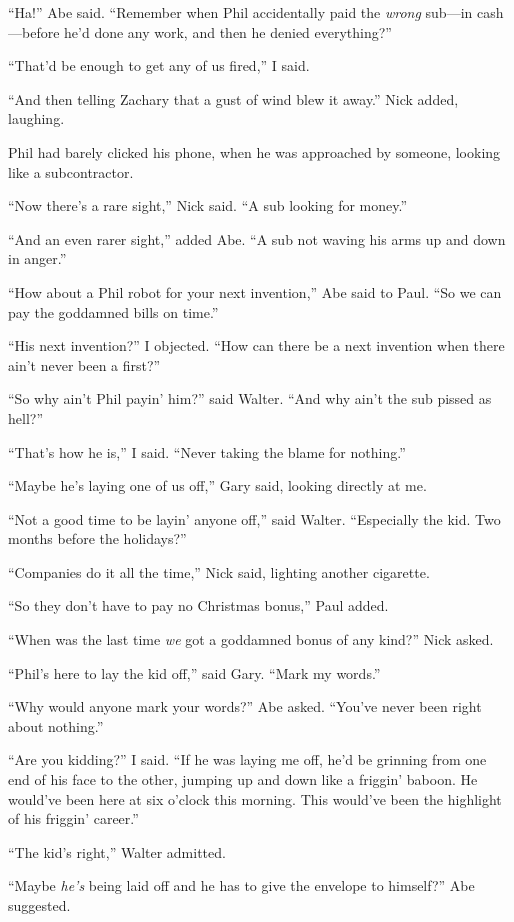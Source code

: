 ``Ha!'' Abe said. ``Remember when Phil accidentally paid the
\emph{wrong} sub---in cash---before he'd done any work, and then he
denied everything?''

``That'd be enough to get any of us fired,'' I said.

``And then telling Zachary that a gust of wind blew it away.'' Nick
added, laughing.

Phil had barely clicked his phone, when he was approached by someone,
looking like a subcontractor.

``Now there's a rare sight,'' Nick said. ``A sub looking for money.''

``And an even rarer sight,'' added Abe. ``A sub not waving his arms up
and down in anger.''

``How about a Phil robot for your next invention,'' Abe said to Paul.
``So we can pay the goddamned bills on time.''

``His next invention?'' I objected. ``How can there be a next invention
when there ain't never been a first?''

``So why ain't Phil payin' him?'' said Walter. ``And why ain't the sub
pissed as hell?''

``That's how he is,'' I said. ``Never taking the blame for nothing.''

``Maybe he's laying one of us off,'' Gary said, looking directly at me.

``Not a good time to be layin' anyone off,'' said Walter. ``Especially
the kid. Two months before the holidays?''

``Companies do it all the time,'' Nick said, lighting another cigarette.

``So they don't have to pay no Christmas bonus,'' Paul added.

``When was the last time \emph{we} got a goddamned bonus of any kind?''
Nick asked.

``Phil's here to lay the kid off,'' said Gary. ``Mark my words.''

``Why would anyone mark your words?'' Abe asked. ``You've never been
right about nothing.''

``Are you kidding?'' I said. ``If he was laying me off, he'd be grinning
from one end of his face to the other, jumping up and down like a
friggin' baboon. He would've been here at six o'clock this morning. This
would've been the highlight of his friggin' career.''

``The kid's right,'' Walter admitted.

``Maybe \emph{he's} being laid off and he has to give the envelope to
himself?'' Abe suggested.

